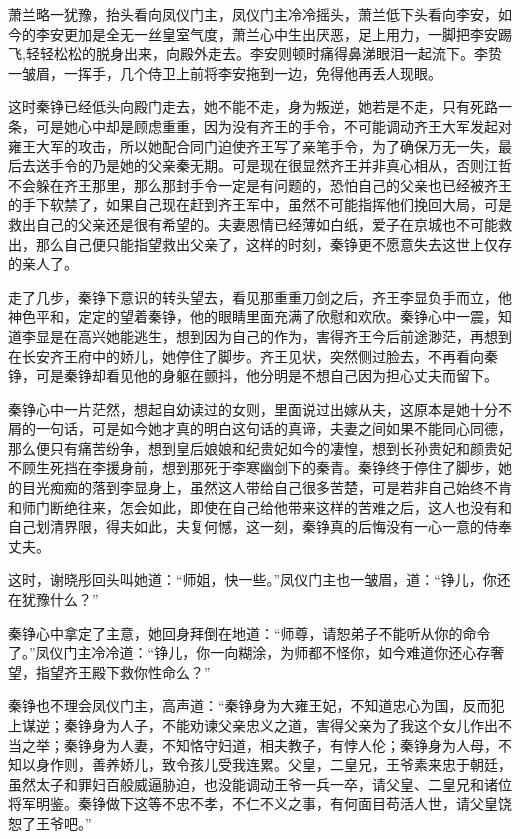萧兰略一犹豫，抬头看向凤仪门主，凤仪门主冷冷摇头，萧兰低下头看向李安，如今的李安更加是全无一丝皇室气度，萧兰心中生出厌恶，足上用力，一脚把李安踢飞,轻轻松松的脱身出来，向殿外走去。李安则顿时痛得鼻涕眼泪一起流下。李贽一皱眉，一挥手，几个侍卫上前将李安拖到一边，免得他再丢人现眼。

这时秦铮已经低头向殿门走去，她不能不走，身为叛逆，她若是不走，只有死路一条，可是她心中却是顾虑重重，因为没有齐王的手令，不可能调动齐王大军发起对雍王大军的攻击，所以她配合同门迫使齐王写了亲笔手令，为了确保万无一失，最后去送手令的乃是她的父亲秦无期。可是现在很显然齐王并非真心相从，否则江哲不会躲在齐王那里，那么那封手令一定是有问题的，恐怕自己的父亲也已经被齐王的手下软禁了，如果自己现在赶到齐王军中，虽然不可能指挥他们挽回大局，可是救出自己的父亲还是很有希望的。夫妻恩情已经薄如白纸，爱子在京城也不可能救出，那么自己便只能指望救出父亲了，这样的时刻，秦铮更不愿意失去这世上仅存的亲人了。

走了几步，秦铮下意识的转头望去，看见那重重刀剑之后，齐王李显负手而立，他神色平和，定定的望着秦铮，他的眼睛里面充满了欣慰和欢欣。秦铮心中一震，知道李显是在高兴她能逃生，想到因为自己的作为，害得齐王今后前途渺茫，再想到在长安齐王府中的娇儿，她停住了脚步。齐王见状，突然侧过脸去，不再看向秦铮，可是秦铮却看见他的身躯在颤抖，他分明是不想自己因为担心丈夫而留下。

秦铮心中一片茫然，想起自幼读过的女则，里面说过出嫁从夫，这原本是她十分不屑的一句话，可是如今她才真的明白这句话的真谛，夫妻之间如果不能同心同德，那么便只有痛苦纷争，想到皇后娘娘和纪贵妃如今的凄惶，想到长孙贵妃和颜贵妃不顾生死挡在李援身前，想到那死于李寒幽剑下的秦青。秦铮终于停住了脚步，她的目光痴痴的落到李显身上，虽然这人带给自己很多苦楚，可是若非自己始终不肯和师门断绝往来，怎会如此，即使在自己给他带来这样的苦难之后，这人也没有和自己划清界限，得夫如此，夫复何憾，这一刻，秦铮真的后悔没有一心一意的侍奉丈夫。

这时，谢晓彤回头叫她道：“师姐，快一些。”凤仪门主也一皱眉，道：“铮儿，你还在犹豫什么？”

秦铮心中拿定了主意，她回身拜倒在地道：“师尊，请恕弟子不能听从你的命令了。”凤仪门主冷冷道：“铮儿，你一向糊涂，为师都不怪你，如今难道你还心存奢望，指望齐王殿下救你性命么？”

秦铮也不理会凤仪门主，高声道：“秦铮身为大雍王妃，不知道忠心为国，反而犯上谋逆；秦铮身为人子，不能劝谏父亲忠义之道，害得父亲为了我这个女儿作出不当之举；秦铮身为人妻，不知恪守妇道，相夫教子，有悖人伦；秦铮身为人母，不知以身作则，善养娇儿，致令孩儿受我连累。父皇，二皇兄，王爷素来忠于朝廷，虽然太子和罪妇百般威逼胁迫，也没能调动王爷一兵一卒，请父皇、二皇兄和诸位将军明鉴。秦铮做下这等不忠不孝，不仁不义之事，有何面目苟活人世，请父皇饶恕了王爷吧。”

